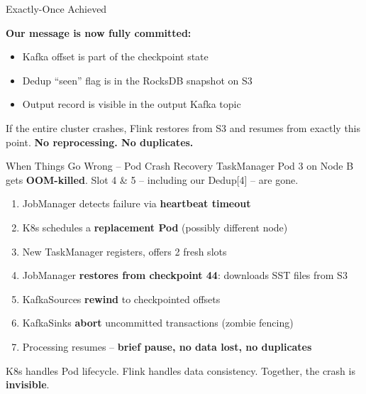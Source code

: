 \documentclass[aspectratio=169]{beamer}
\begin{document}
\begin{frame}{Exactly-Once Achieved}
    \colorbox{utu_green!20}{\parbox{0.95\textwidth}{
        \centering
        \vspace{0.2cm}
        \textbf{Our message is now fully committed:}
        \begin{itemize}
            \item Kafka offset is part of the checkpoint state
            \item Dedup ``seen'' flag is in the RocksDB snapshot on S3
            \item Output record is visible in the output Kafka topic
        \end{itemize}
        \vspace{0.2cm}
        If the entire cluster crashes, Flink restores from S3 and resumes from exactly this point. \textbf{No reprocessing. No duplicates.}
        \vspace{0.2cm}
    }}
\end{frame}

\begin{frame}{When Things Go Wrong -- Pod Crash Recovery}
    TaskManager Pod 3 on Node B gets \textbf{OOM-killed}. Slot 4 \& 5 -- including our Dedup[4] -- are gone.

    \vspace{0.3cm}
    \begin{enumerate}
        \item JobManager detects failure via \textbf{heartbeat timeout}
        \item K8s schedules a \textbf{replacement Pod} (possibly different node)
        \item New TaskManager registers, offers 2 fresh slots
        \item JobManager \textbf{restores from checkpoint 44}: downloads SST files from S3
        \item KafkaSources \textbf{rewind} to checkpointed offsets
        \item KafkaSinks \textbf{abort} uncommitted transactions (zombie fencing)
        \item Processing resumes -- \textbf{brief pause, no data lost, no duplicates}
    \end{enumerate}

    \vspace{0.2cm}
    \colorbox{utu_blue!20}{\parbox{0.9\textwidth}{
        \centering
        K8s handles Pod lifecycle. Flink handles data consistency. Together, the crash is \textbf{invisible}.
    }}
\end{frame}
\end{document}
